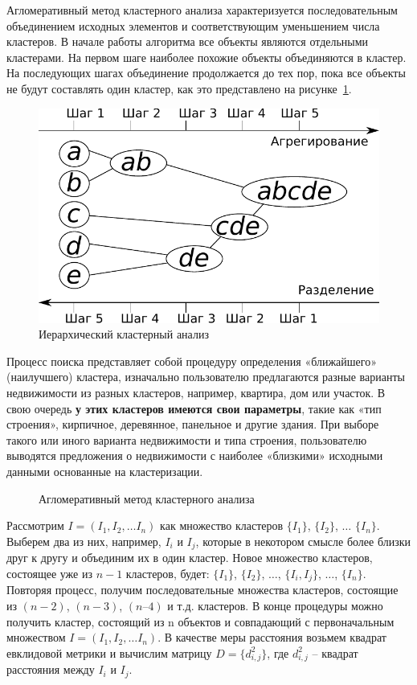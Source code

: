 \documentclass[a4paper,14pt,openany,final]{extreport} %
\def\oldcaption{} \let\oldcaption=\caption
\def\caption{\stepcounter{captionsnum}\oldcaption}
\begin{document}
{Агломеративный метод кластерного анализа характеризуется последовательным объединением исходных элементов и соответствующим уменьшением числа кластеров. В начале работы алгоритма все объекты являются отдельными кластерами. На первом шаге наиболее похожие объекты объединяются в кластер. На последующих шагах объединение продолжается до тех пор, пока все объекты не будут составлять один кластер, как это представлено на рисунке~\ref{fig:hclustdescr}.
\begin{figure}[htbp]
  \centering
  \includegraphics[width=0.5\linewidth]{hclustexp.pdf}
  \caption{Иерархический кластерный анализ}
  \label{fig:hclustdescr}
\end{figure}


Процесс поиска представляет собой процедуру определения «ближайшего» (наилучшего) кластера, изначально пользователю предлагаются разные варианты недвижимости из разных кластеров, например, квартира, дом или участок. В свою очередь\textbf{ у этих кластеров имеются свои параметры}, такие как «тип строения», кирпичное, деревянное, панельное и другие здания. При выборе такого или иного варианта недвижимости и типа строения, пользователю выводятся предложения о недвижимости с наиболее «близкими» исходными данными основанные на кластеризации.

\begin{figure}[htbp]
  \centering

  \caption{Агломеративный метод кластерного анализа}
  \label{fig:clusagloshow}
\end{figure}

Рассмотрим $Ι = (Ι_1, Ι_2, \ldots Ι_n)$ как множество кластеров $\{Ι_1\}$, $\{Ι_2\}$, $\ldots$ $\{Ι_n\}$. Выберем два из них, например, $Ι_i$ и $Ι_j$, которые в некотором смысле более близки друг к другу и объединим их в один кластер. Новое множество кластеров, состоящее уже из $n-1$ кластеров, будет: $\{Ι_1\}$, $\{Ι_2\}$, $\ldots$, $\{Ι_i , Ι_j\}$, $\ldots$, $\{Ι_n\}$. Повторяя процесс, получим последовательные множества кластеров, состоящие из $(n-2)$, $(n-3)$, $(n–4)$ и т.д. кластеров. В конце процедуры можно получить кластер, состоящий из n объектов и совпадающий с первоначальным множеством $Ι = (Ι_1, Ι_2, \ldots Ι_n)$. В качестве меры расстояния возьмем квадрат евклидовой метрики и вычислим матрицу $D= \{d_{i,j}^2 \}$, где $d_{i,j}^2$ -- квадрат расстояния между $Ι_i$ и $Ι_j$.

}
\end{document}
